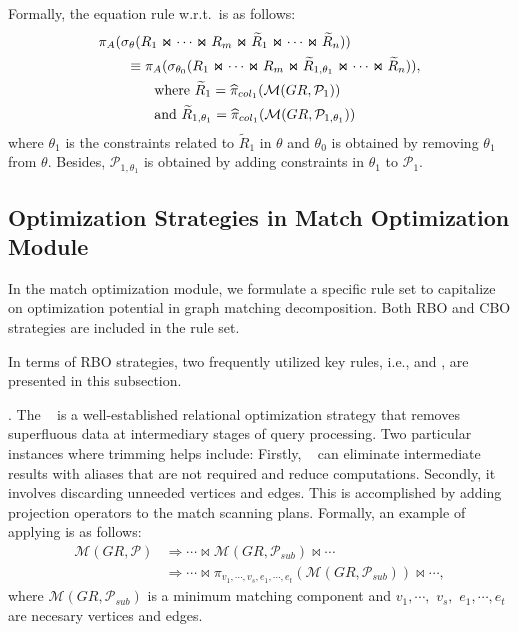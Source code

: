 Formally, the equation rule w.r.t.~\filterrule is as follows:
\begin{equation}
    \begin{split}
        & \pi_A(\sigma_{\theta}(R_1 \Join \cdots \Join R_m \Join \widetilde{R}_1 \Join \cdots \Join \widetilde{R}_n)) \\
        & \hspace*{2em} \equiv \pi_A(\sigma_{\theta_0}(R_1 \Join \cdots \Join R_m \Join \widetilde{R}_{1, \theta_1} \Join \cdots \Join \widetilde{R}_n)), \\
        & \hspace*{4em} \text{where } \widetilde{R}_{1} = \widehat{\pi}_{col_1}(\mathcal{M}(GR, \mathcal{P}_1)) \\
        & \hspace*{4em} \text{and } \widetilde{R}_{1,\theta_1} = \widehat{\pi}_{col_1}(\mathcal{M}(GR, \mathcal{P}_{1,\theta_1}))
    \end{split}
\end{equation}
where $\theta_1$ is the constraints related to $\widetilde{R}_1$ in $\theta$ and $\theta_0$ is obtained by removing $\theta_1$ from $\theta$.
Besides, $\mathcal{P}_{1,\theta_1}$ is obtained by adding constraints in $\theta_1$ to $\mathcal{P}_1$.


\subsection{Optimization Strategies in Match Optimization Module}

In the match optimization module, we formulate a specific rule set to capitalize on optimization potential in graph matching decomposition. 
Both RBO and CBO strategies are included in the rule set.

In terms of RBO strategies, two frequently utilized key rules, i.e., \trimrule and \fusionrule, are presented in this subsection.

\trimrule. 
The \trimrule~ is a well-established relational optimization strategy that removes superfluous data at intermediary stages of query processing. 
Two particular instances where trimming helps include: 
Firstly, \trimrule~ can eliminate intermediate results with aliases that are not required and reduce computations.
Secondly, it involves discarding unneeded vertices and edges.
This is accomplished by adding projection operators to the match scanning plans.
Formally, an example of applying \trimrule is as follows:
\begin{equation}
    \begin{split}
        \mathcal{M}(GR, \mathcal{P}) & \Rightarrow \cdots \Join \mathcal{M}(GR, \mathcal{P}_{sub}) \Join \cdots \\
        & \Rightarrow \cdots \Join \pi_{v_1, \cdots, v_s, e_1, \cdots, e_t}(\mathcal{M}(GR, \mathcal{P}_{sub})) \Join \cdots,
    \end{split} 
\end{equation}
where $\mathcal{M}(GR, \mathcal{P}_{sub})$ is a minimum matching component and $v_1, \cdots,$ $v_s,$ $e_1, \cdots, e_t$ are necesary vertices and edges.

